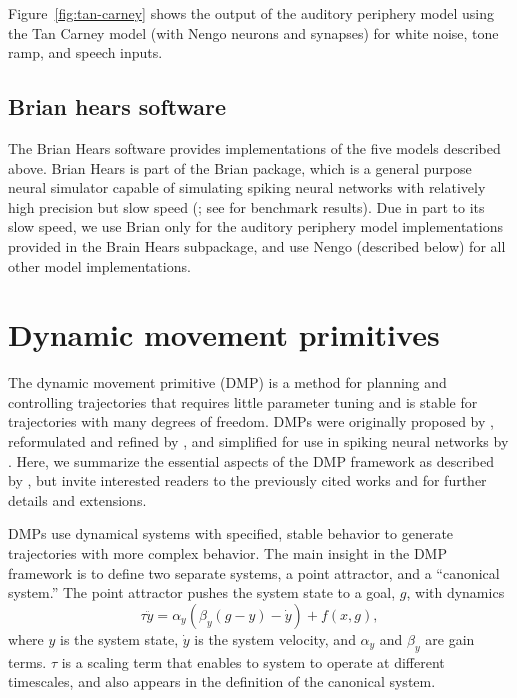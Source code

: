 Figure~\ref{fig:tan-carney} shows the output
of the auditory periphery model
using the Tan Carney model
(with Nengo neurons and synapses)
for white noise, tone ramp, and speech inputs.


\subsection{Brian hears software}
\label{sec:brian-hears}

The Brian Hears software
\citep{fontaine2011}
provides implementations
of the five models described above.
Brian Hears is part of the
Brian package,
which is a general purpose
neural simulator capable
of simulating spiking neural networks
with relatively high precision
but slow speed
(\citealp{goodman2008};
see \citealt{bekolay2013} for benchmark results).
Due in part to its slow speed,
we use Brian only for
the auditory periphery model implementations
provided in the Brain Hears subpackage,
and use Nengo (described below)
for all other model implementations.

\section{Dynamic movement primitives}
\label{sec:methods-dmp}

The dynamic movement primitive (DMP)
is a method for planning and controlling trajectories
that requires little parameter tuning
and is stable for trajectories
with many degrees of freedom.
DMPs were originally proposed
by \citet{schaal2005,schaal2006},
reformulated and refined by \citet{ijspeert2007},
and simplified for use in spiking neural networks
by \citet{dewolf2015}.
Here, we summarize the essential aspects
of the DMP framework as described by \citet{dewolf2015},
but invite interested readers to
the previously cited works
and \citet{vijayakumar2005,ijspeert2013}
for further details and extensions.

DMPs use dynamical systems
with specified, stable behavior
to generate trajectories
with more complex behavior.
The main insight in the DMP framework
is to define two separate systems,
a point attractor,
and a ``canonical system.''
The point attractor pushes
the system state to
a goal, $g$, with dynamics
\begin{equation}
  \label{dmp-pointattractor}
  \tau\ddot{y} = \alpha_y(\beta_y(g - y) - \dot{y}) + f(x, g),
\end{equation}
where $y$ is the system state,
$\dot{y}$ is the system velocity,
and $\alpha_y$ and $\beta_y$ are gain terms.
$\tau$ is a scaling term
that enables to system to operate
at different timescales,
and also appears in the definition
of the canonical system.

